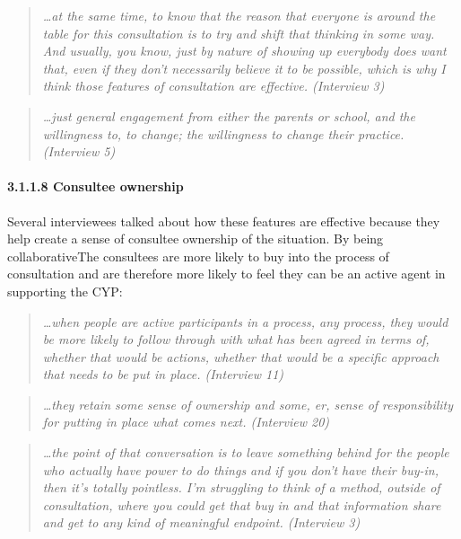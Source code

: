 \documentclass[
]{article}
\begin{document}
\begin{quote}
\emph{\ldots at the same time, to know that the reason that everyone is
around the table for this consultation is to try and shift that thinking
in some way. And usually, you know, just by nature of showing up
everybody does want that, even if they don't necessarily believe it to
be possible, which is why I think those features of consultation are
effective. (Interview 3)}
\end{quote}

\begin{quote}
\emph{\ldots just general engagement from either the parents or school,
and the willingness to, to change; the willingness to change their
practice. (Interview 5)}
\end{quote}

\hypertarget{consultee-ownership}{%
\paragraph{3.1.1.8 Consultee ownership}\label{consultee-ownership}}

Several interviewees talked about how these features are effective
because they help create a sense of consultee ownership of the
situation. By being collaborativeThe consultees are more likely to buy
into the process of consultation and are therefore more likely to feel
they can be an active agent in supporting the CYP:

\begin{quote}
\emph{\ldots when people are active participants in a process, any
process, they would be more likely to follow through with what has been
agreed in terms of, whether that would be actions, whether that would be
a specific approach that needs to be put in place. (Interview 11)}
\end{quote}

\begin{quote}
\emph{\ldots they retain some sense of ownership and some, er, sense of
responsibility for putting in place what comes next. (Interview 20)}
\end{quote}

\begin{quote}
\emph{\ldots the point of that conversation is to leave something behind
for the people who actually have power to do things and if you don't
have their buy-in, then it's totally pointless. I'm struggling to think
of a method, outside of consultation, where you could get that buy in
and that information share and get to any kind of meaningful endpoint.
(Interview 3)}
\end{quote}
\end{document}
